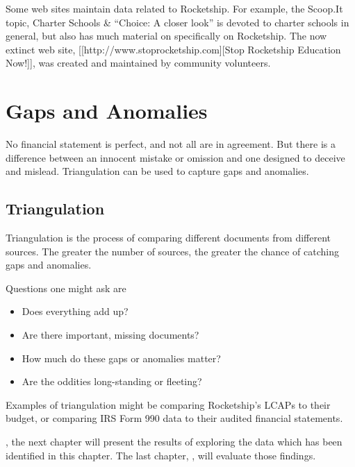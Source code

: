 Some web sites maintain data related to Rocketship. For example, the Scoop.It topic, Charter Schools \& ``Choice: A closer look'' \textcite{Marachi2016} is devoted to charter schools in general, but also has much material on specifically on Rocketship. The now extinct web site, [[http://www.stoprocketship.com][Stop Rocketship Education Now!]], was created and maintained by community volunteers. 

\section{Gaps and Anomalies}\label{sec:gaps-anomalies}\indent

No financial statement is perfect, and not all are in agreement. But there is a difference between an innocent mistake or omission and one designed to deceive and mislead. Triangulation can be used to capture gaps and anomalies.

\subsection{Triangulation}\label{sec:triangulation}\indent

Triangulation is the process of comparing different documents from different sources. The greater the number of sources, the greater the chance of catching gaps and anomalies.

Questions one might ask are
\begin{itemize}
  \item Does everything add up? 
  \item Are there important, missing documents? 
  \item How much do these gaps or anomalies matter? 
  \item Are the oddities long-standing or fleeting? 
\end{itemize}
Examples of triangulation might be comparing Rocketship's LCAPs to their budget, or comparing IRS Form 990 data to their audited financial statements.

, the next chapter will present the results of exploring the data which has been identified in this chapter. The last chapter, , will evaluate those findings.

